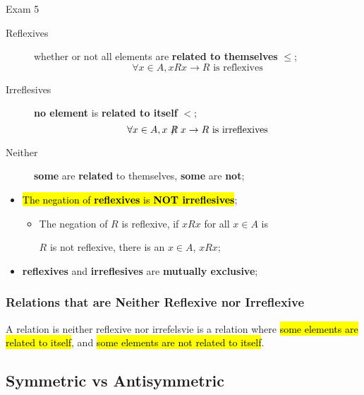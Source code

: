 \documentclass{note}
\begin{document}
\begin{note}{Exam 5}
        \begin{description}
            \item[Reflexives] whether or not all elements are \textbf{related to themselves} $ \leq $;
            \begin{displaymath}
                \forall x \in A, x R x \to R \text{ is reflexives}
            \end{displaymath}

            \item[Irreflesives] \textbf{no element} is \textbf{related to itself} $ < $;
            \begin{displaymath}
                \forall x \in A, x \not \mathrel{R} x \to R \text{ is irreflexives}
            \end{displaymath}

            \item[Neither] \textbf{some} are \textbf{related} to themselves, \textbf{some} are \textbf{not};
        \end{description}

        \begin{itemize}
            \item \hl{The negation of \textbf{reflexives} is \textbf{NOT irreflesives}};
            \begin{itemize}
                \item The negation of $ R $ is reflexive, if $ x R x $ for all $ x \in A $ is
                \begin{center}
                    $ R $ is not reflexive, there is an $ x \in A $, $ x R x $;
                \end{center}
            \end{itemize}

            \item \textbf{reflexives} and \textbf{irreflesives} are \textbf{mutually exclusive};
        \end{itemize}

	\subsubsection{Relations that are Neither Reflexive nor Irreflexive}

	A relation is neither reflexive nor irrefelsvie is a relation where \hl{some elements are related to itself}, and \hl{some elements are 
	not related to itself}.

        \subsection{Symmetric vs Antisymmetric}\label{sec: symmetric and antisymmetric}


\end{note}
\end{document}

